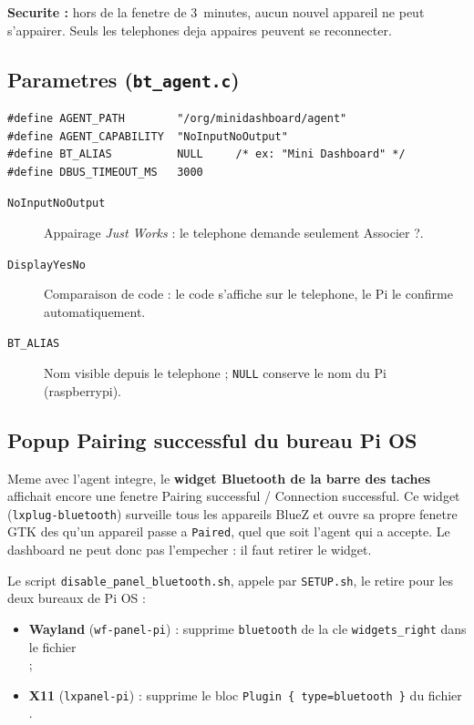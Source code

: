 \documentclass[a4paper,11pt]{article}
\begin{document}
\textbf{Securite :} hors de la fenetre de 3~minutes, aucun nouvel appareil ne peut
s'appairer. Seuls les telephones deja appaires peuvent se reconnecter.

\subsection{Parametres (\texttt{bt\_agent.c})}

\begin{lstlisting}[style=ccode,caption={bt\_agent.c --- configuration}]
#define AGENT_PATH        "/org/minidashboard/agent"
#define AGENT_CAPABILITY  "NoInputNoOutput"
#define BT_ALIAS          NULL     /* ex: "Mini Dashboard" */
#define DBUS_TIMEOUT_MS   3000
\end{lstlisting}

\begin{description}
  \item[\texttt{NoInputNoOutput}] Appairage \emph{Just Works} : le telephone demande
    seulement \og Associer ?\fg{}.
  \item[\texttt{DisplayYesNo}] Comparaison de code : le code s'affiche sur le telephone,
    le Pi le confirme automatiquement.
  \item[\texttt{BT\_ALIAS}] Nom visible depuis le telephone ; \texttt{NULL} conserve le nom
    du Pi (\og raspberrypi\fg{}).
\end{description}

\subsection{Popup \og Pairing successful\fg{} du bureau Pi OS}
\label{sec:popup}

Meme avec l'agent integre, le \textbf{widget Bluetooth de la barre des taches} affichait
encore une fenetre \og Pairing successful / Connection successful\fg{}. Ce widget
(\texttt{lxplug-bluetooth}) surveille tous les appareils BlueZ et ouvre sa propre fenetre
GTK des qu'un appareil passe a \texttt{Paired}, quel que soit l'agent qui a accepte.
Le dashboard ne peut donc pas l'empecher : il faut retirer le widget.

Le script \texttt{disable\_panel\_bluetooth.sh}, appele par \texttt{SETUP.sh}, le retire
pour les deux bureaux de Pi OS :
\begin{itemize}
  \item \textbf{Wayland} (\texttt{wf-panel-pi}) : supprime \texttt{bluetooth} de la cle
    \texttt{widgets\_right} dans le fichier\\
     ;
  \item \textbf{X11} (\texttt{lxpanel-pi}) : supprime le bloc \texttt{Plugin \{ type=bluetooth \}}
    du fichier\\
    .
\end{itemize}
\end{document}

